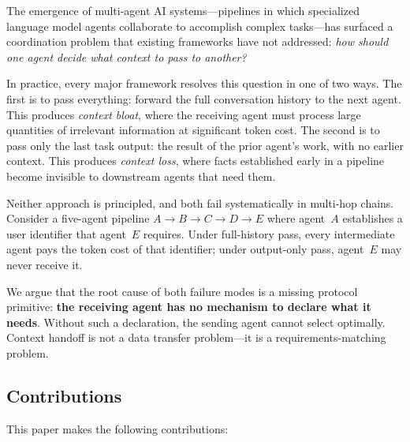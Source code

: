 \documentclass[11pt]{article}
\begin{document}
The emergence of multi-agent AI systems—pipelines in which specialized
language model agents collaborate to accomplish complex tasks—has surfaced a
coordination problem that existing frameworks have not addressed: \emph{how
should one agent decide what context to pass to another?}

In practice, every major framework resolves this question in one of two ways.
The first is to pass everything: forward the full conversation history to the
next agent. This produces \emph{context bloat}, where the receiving agent must
process large quantities of irrelevant information at significant token cost.
The second is to pass only the last task output: the result of the prior
agent's work, with no earlier context. This produces \emph{context loss},
where facts established early in a pipeline become invisible to downstream
agents that need them.

Neither approach is principled, and both fail systematically in multi-hop
chains. Consider a five-agent pipeline $A \to B \to C \to D \to E$ where
agent~$A$ establishes a user identifier that agent~$E$ requires. Under
full-history pass, every intermediate agent pays the token cost of that
identifier; under output-only pass, agent~$E$ may never receive it.

We argue that the root cause of both failure modes is a missing protocol
primitive: \textbf{the receiving agent has no mechanism to declare what it
needs}. Without such a declaration, the sending agent cannot select optimally.
Context handoff is not a data transfer problem—it is a requirements-matching
problem.

\subsection{Contributions}

This paper makes the following contributions:
\end{document}
